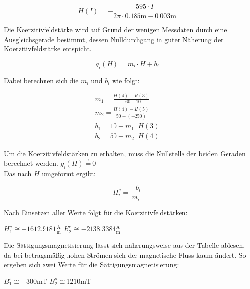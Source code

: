 \begin{equation}
H(I)=-\frac{595\cdot I}{2\pi \cdot 0.185\si{\m}-0.003\si{\m}}
\end{equation}

Die Koerzitivfeldstärke wird auf Grund der wenigen Messdaten durch eine Ausgleichsgerade bestimmt, dessen
Nulldurchgang in guter Näherung der Koerzitivfeldstärke entspicht.

\begin{equation}
g_i(H)=m_i\cdot H+b_i
\end{equation}
  
Dabei berechnen sich die $m_i$ und $b_i$ wie folgt:

\begin{gather}
m_1=\frac{H(4)-H(3)}{-60-10} \\
m_2=\frac{H(4)-H(5)}{50-(-250)}\\
b_1=10-m_1\cdot H(3)\\
b_2=50-m_2\cdot H(4)
\end{gather}

Um die Koerzitivfeldstärken zu erhalten, muss die Nullstelle der beiden Geraden berechnet werden. \quad $g_i(H) \stackrel{!}{=}0$\\
Das nach $H$ umgeformt ergibt:

\begin{equation}
H_{i}^{c}=\frac{-b_i}{m_i}
\end{equation}

Nach Einsetzen aller Werte folgt für die Koerzitivfeldstärken:

\quad $H_{1}^{c}\cong -1612.9181 \frac{\si{\ampere}}{\si{\m}}$
\quad $H_{2}^{c}\cong -2138.3384 \frac{\si{\ampere}}{\si{\m}}$

Die Sättigungsmagnetisierung lässt sich näherungsweise aus der Tabelle ablesen, da bei betragsmäßig hohen
Strömen sich der magnetische Fluss kaum ändert. So ergeben sich zwei Werte für die Sättigungsmagnetisierung:

\quad $B_{1}^{s}\cong -300 \si{\milli\tesla}$
\quad $B_{2}^{s}\cong 1210 \si{\milli\tesla}$























